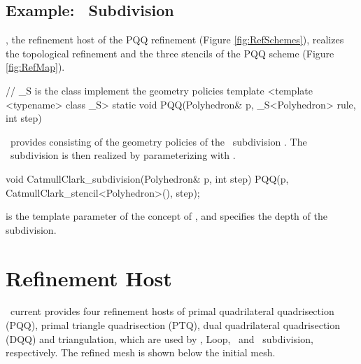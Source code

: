 
\subsection{Example: \CC\ Subdivision}
, the refinement 
host of the PQQ refinement (Figure \ref{fig:RefSchemes}),
realizes the topological refinement and the three stencils
of the PQQ scheme (Figure \ref{fig:RefMap}).

\begin{ccExampleCode}
  // _S is the class implement the geometry policies
  template <template <typename> class _S>
  static void PQQ(Polyhedron& p, _S<Polyhedron> rule, int step)
\end{ccExampleCode}

\ provides  consisting of the 
geometry policies of the \CC\ subdivision \cite{Catmull-sub-1978}. 
The \CC\ subdivision is then realized by parameterizing 
 with 
.

\begin{ccExampleCode}
  void CatmullClark_subdivision(Polyhedron& p, int step) {
    PQQ(p, CatmullClark_stencil<Polyhedron>(), step);
  }
\end{ccExampleCode}

 is the template parameter of the concept of
, and  specifies the
depth of the subdivision.



\section{Refinement Host}
\ current provides four refinement hosts of primal 
quadrilateral quadrisection (PQQ), primal triangle 
quadrisection (PTQ), dual quadrilateral 
quadrisection (DQQ) and  triangulation, which 
are used by \CC, Loop, \DS\ and \ subdivision, 
respectively. The refined mesh is shown below 
the initial mesh.

